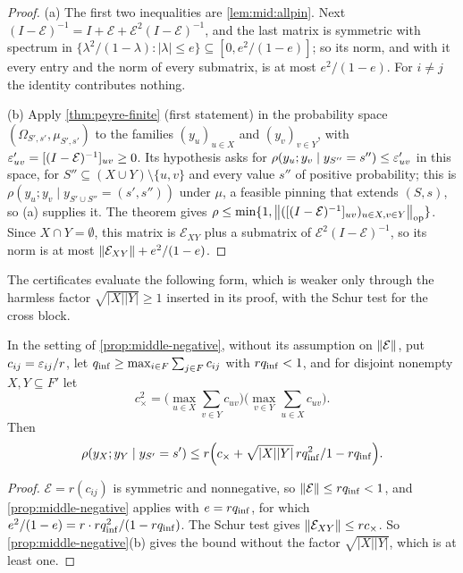 \begin{proof}
(a) The first two inequalities are \cref{lem:mid:allpin}. Next
$(I-\mathcal E)^{-1}=I+\mathcal E+\mathcal E^2(I-\mathcal E)^{-1}$, and the
last matrix is symmetric with spectrum in $\{\lambda^2/(1-\lambda):|\lambda|\le
e\}\subseteq[0,e^2/(1-e)]$; so its norm, and with it every entry and the norm of
every submatrix, is at most $e^2/(1-e)$. For $i\ne j$ the identity contributes
nothing.

(b) Apply \cref{thm:peyre-finite} (first statement) in the probability space
$(\Omega_{S',s'},\mu_{S',s'})$ to the families $(y_u)_{u\in X}$ and $(y_v)_{v\in
Y}$, with $\eps'_{uv}=[(I-\mathcal E)^{-1}]_{uv}\ge0$. Its hypothesis asks for
$\rho(y_u;y_v\mid y_{S''}=s'')\le\eps'_{uv}$ in this space, for
$S''\subseteq(X\cup Y)\setminus\{u,v\}$ and every value $s''$ of positive
probability; this is $\rho(y_u;y_v\mid y_{S'\cup S''}=(s',s''))$ under $\mu$, a
feasible pinning that extends $(S,s)$, so (a) supplies it. The theorem gives
$\rho\le\min\{1,\opnorm{([(I-\mathcal E)^{-1}]_{uv})_{u\in X,v\in Y}}\}$. Since
$X\cap Y=\emptyset$, this matrix is $\mathcal E_{XY}$ plus a submatrix of
$\mathcal E^2(I-\mathcal E)^{-1}$, so its norm is at most $\norm{\mathcal
E_{XY}}+e^2/(1-e)$.
\end{proof}

The certificates evaluate the following form, which is weaker
only through the harmless factor $\sqrt{|X||Y|}\ge1$ inserted in
its proof, with the Schur test for the cross block.

\begin{corollary}\label{cor:influence-schur}
In the setting of \cref{prop:middle-negative}, without its assumption on
$\norm{\mathcal E}$, put $c_{ij}=\eps_{ij}/r$, let
$q_{\rm inf}\ge\max_{i\in F}\sum_{j\in F}c_{ij}$ with $rq_{\rm inf}<1$, and for
disjoint nonempty $X,Y\subseteq F'$ let
\[
  c_\times^2=\Big(\max_{u\in X}\sum_{v\in Y}c_{uv}\Big)\Big(\max_{v\in
  Y}\sum_{u\in X}c_{uv}\Big).
\]
Then
\[
  \rho(y_X;y_Y\mid y_{S'}=s')\le r\Big(c_\times+\sqrt{|X||Y|}\,\frac{rq_{\rm inf}^2}{1-rq_{\rm inf}}\Big).
\]
\end{corollary}

\begin{proof}
$\mathcal E=r(c_{ij})$ is symmetric and nonnegative, so $\norm{\mathcal E}\le
rq_{\rm inf}<1$, and \cref{prop:middle-negative} applies with $e=rq_{\rm inf}$,
for which $e^2/(1-e)=r\cdot rq_{\rm inf}^2/(1-rq_{\rm inf})$. The Schur test gives
$\norm{\mathcal E_{XY}}\le rc_\times$. So \cref{prop:middle-negative}(b) gives the
bound without the factor $\sqrt{|X||Y|}$, which is at least one.
\end{proof}

